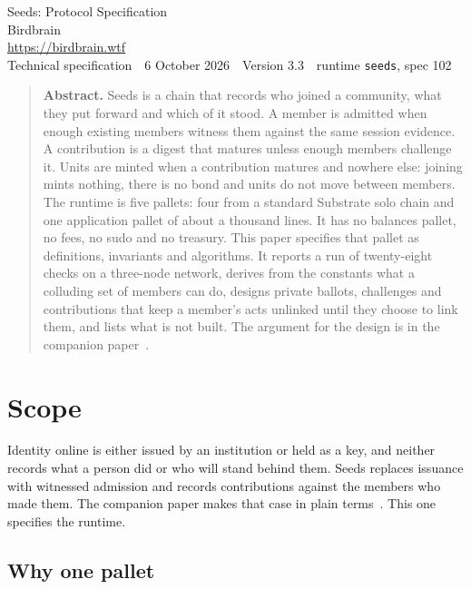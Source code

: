 \documentclass[11pt,a4paper]{article}
\theoremstyle{definition}
\theoremstyle{plain}
\theoremstyle{remark}
\begin{document}
\thispagestyle{plain}

\begin{center}
{\displayfont\LARGE\color{ink} Seeds: Protocol Specification}\\[5mm]
{\normalsize Birdbrain}\\[0.5mm]
{\small\color{muted} \url{https://birdbrain.wtf}}\\[1mm]
{\small\color{muted} Technical specification \,\textperiodcentered\, 6 October 2026 \,\textperiodcentered\, Version 3.3 \,\textperiodcentered\, runtime \texttt{seeds}, spec 102}
\end{center}

\vspace{2mm}
\begin{quote}
\small
\textbf{Abstract.} Seeds is a chain that records who joined a community, what they put forward and which of it stood. A member is admitted when enough existing members witness them against the same session evidence. A contribution is a digest that matures unless enough members challenge it. Units are minted when a contribution matures and nowhere else: joining mints nothing, there is no bond and units do not move between members. The runtime is five pallets: four from a standard Substrate solo chain and one application pallet of about a thousand lines. It has no balances pallet, no fees, no sudo and no treasury. This paper specifies that pallet as definitions, invariants and algorithms. It reports a run of twenty-eight checks on a three-node network, derives from the constants what a colluding set of members can do, designs private ballots, challenges and contributions that keep a member's acts unlinked until they choose to link them, and lists what is not built. The argument for the design is in the companion paper~\cite{seedsintro}.
\end{quote}

\section{Scope}
\label{sec:scope}

Identity online is either issued by an institution or held as a key, and neither records what a person did or who will stand behind them. Seeds replaces issuance with witnessed admission and records contributions against the members who made them. The companion paper makes that case in plain terms~\cite{seedsintro}. This one specifies the runtime.

\subsection{Why one pallet}
\end{document}
